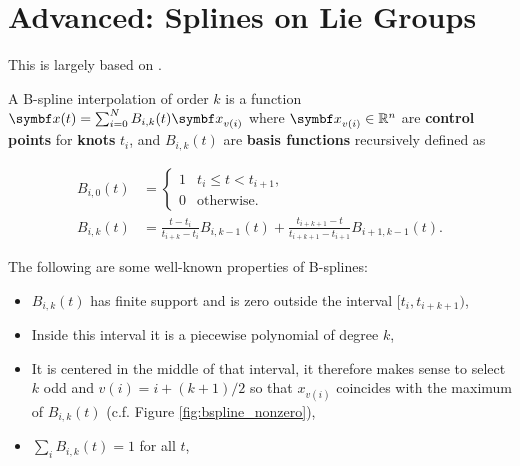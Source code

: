 
\chapter{Advanced: Splines on Lie Groups}

This is largely based on \cite{patron-perez_spline-based_2015, sommer_efficient_2020}.


\begin{figure}[h]
  \begin{center}
  \end{center}
\end{figure}

A B-spline interpolation of order $k$ is a function $\x(t) = \sum_{i=0}^N B_{i, k}(t) \x_{v(i)}$ where $\x_{v(i)} \in \mathbb{R}^n$ are \textbf{control points} for \textbf{knots} $t_i$, and $B_{i, k}(t)$ are \textbf{basis functions} recursively defined as

\begin{equation}
  \label{eq:b_spline_rec}
  \begin{aligned}
    B_{i, 0}(t) & = \begin{cases}
      1 & t_i \leq t < t_{i+1}, \\
      0 & \text{otherwise}.
    \end{cases}                                                                                \\
    B_{i, k}(t) & = \frac{t - t_i}{t_{i+k} - t_i} B_{i, k-1}(t) + \frac{t_{i+k+1} - t}{t_{i+k+1} - t_{i+1}} B_{i+1, k-1}(t).
  \end{aligned}
\end{equation}

The following are some well-known properties of B-splines:
\begin{itemize}
  \item $B_{i, k}(t)$ has finite support and is zero outside the interval $[t_{i}, t_{i+k+1})$,
  \item Inside this interval it is a piecewise polynomial of degree $k$,
  \item It is centered in the middle of that interval, it therefore makes sense to select $k$ odd and $v(i) = i + (k + 1) / 2$ so that $x_{v(i)}$ coincides with the maximum of $B_{i, k}(t)$ (c.f. Figure \ref{fig:bspline_nonzero}),
  \item $\sum_i B_{i, k}(t) = 1$ for all $t$,
\end{itemize}

